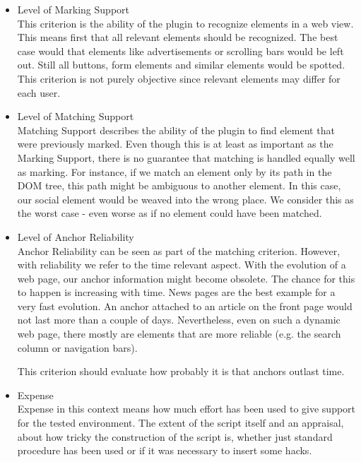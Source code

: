 \begin{itemize}
	\item Level of Marking Support \\
	This criterion is the ability of the plugin to recognize elements in a web view. This means first that all relevant elements should be recognized. The best case would that elements like advertisements or scrolling bars would be left out. Still all buttons, form elements and similar elements would be spotted. This criterion is not purely objective since relevant elements may differ for each user.
	
	\item Level of Matching Support \\	
	Matching Support describes the ability of the plugin to find element that were previously marked. Even though this is at least as important as the Marking Support, there is no guarantee that matching is handled equally well as marking. For instance, if we match an element only by its path in the DOM tree, this path might be ambiguous to another element. In this case, our social element would be weaved into the wrong place. We consider this as the worst case - even worse as if no element could have been matched.
 
	\item Level of Anchor Reliability \\
	Anchor Reliability can be seen as part of the matching criterion. However, with reliability we refer to the time relevant aspect. With the evolution of a web page, our anchor information might become obsolete. The chance for this to happen is increasing with time. News pages are the best example for a very fast evolution. An anchor attached to an article on the front page would not last more than a couple of days. Nevertheless, even on such a dynamic web page, there mostly are elements that are more reliable (e.g. the search column or navigation bars). 
	
	This criterion should evaluate how probably it is that anchors outlast time. 
	
	\item Expense \\
	Expense in this context means how much effort has been used to give support for the tested environment. The extent of the script itself and an appraisal, about how tricky the construction of the script is, whether just standard procedure has been used or if it was necessary to insert some hacks. 
\end{itemize}

